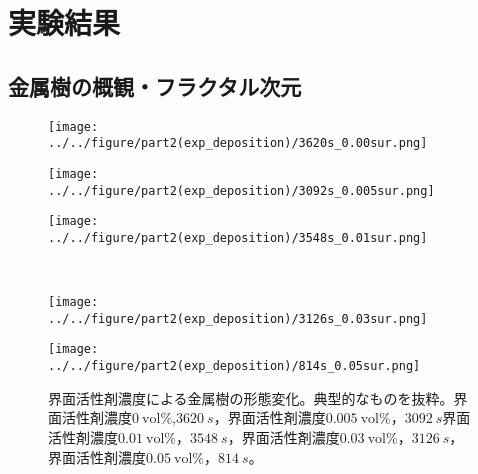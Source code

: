 \documentclass[autodetect-engine,dvi=dvipdfmx,a4paper,ja=standard,oneside,openany,11pt]{bxjsbook}
\begin{document}
\section{実験結果}
\subsection{金属樹の概観・フラクタル次元}

\begin{figure}[htbp]
  \begin{minipage}
    {0.32\textwidth}
    \subcaption{}
    \centering
    \texttt{[image: ../../figure/part2(exp\_deposition)/3620s\_0.00sur.png]}
    \label{fig:non_surfactant}
  \end{minipage}
  \begin{minipage}
    {0.32\textwidth}
    \subcaption{}
    \centering
    \texttt{[image: ../../figure/part2(exp\_deposition)/3092s\_0.005sur.png]}
    \label{fig:0.005_surfactant}
  \end{minipage}
  \begin{minipage}
    {0.32\textwidth}
    \subcaption{}
    \centering
    \texttt{[image: ../../figure/part2(exp\_deposition)/3548s\_0.01sur.png]}
    \label{fig:0.01_surfactant}
  \end{minipage}
  \\
  \begin{minipage}
    {0.32\textwidth}
    \subcaption{}
    \centering
    \texttt{[image: ../../figure/part2(exp\_deposition)/3126s\_0.03sur.png]}
    \label{fig:0.03_surfactant}
  \end{minipage}
  \begin{minipage}
    {0.32\textwidth}
    \subcaption{}
    \centering
    \texttt{[image: ../../figure/part2(exp\_deposition)/814s\_0.05sur.png]}
    \label{fig:0.05_surfactant}
  \end{minipage}
  \caption{界面活性剤濃度による金属樹の形態変化。典型的なものを抜粋。界面活性剤濃度$\SI{0}{\mathrm{vol}\%}$,$\SI{3620}{s}$，界面活性剤濃度$\SI{0.005}{\mathrm{vol}\%}$，$\SI{3092}{s}$界面活性剤濃度$\SI{0.01}{\mathrm{vol}\%}$，$\SI{3548}{s}$，界面活性剤濃度$\SI{0.03}{\mathrm{vol}\%}$，$\SI{3126}{s}$，界面活性剤濃度$\SI{0.05}{\mathrm{vol}\%}$，$\SI{814}{s}$。}
  \label{fig:surfactant}
\end{figure}
\end{document}
